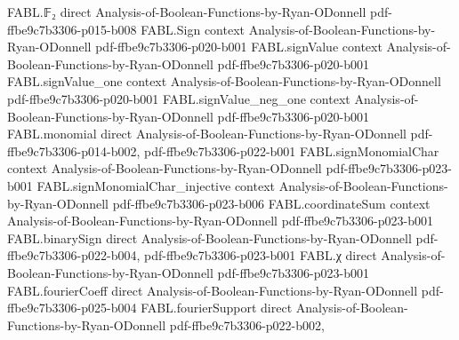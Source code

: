 \begin{theorem}
\label{FABL.widthThreeTseitin_width_le}
\leanok
{}
\proofstep
  {FABL.𝔽₂}
  {direct}
  {Analysis-of-Boolean-Functions-by-Ryan-ODonnell}
  {pdf-ffbe9c7b3306-p015-b008}
\proofstep
  {FABL.Sign}
  {context}
  {Analysis-of-Boolean-Functions-by-Ryan-ODonnell}
  {pdf-ffbe9c7b3306-p020-b001}
\proofstep
  {FABL.signValue}
  {context}
  {Analysis-of-Boolean-Functions-by-Ryan-ODonnell}
  {pdf-ffbe9c7b3306-p020-b001}
\proofstep
  {FABL.signValue_one}
  {context}
  {Analysis-of-Boolean-Functions-by-Ryan-ODonnell}
  {pdf-ffbe9c7b3306-p020-b001}
\proofstep
  {FABL.signValue_neg_one}
  {context}
  {Analysis-of-Boolean-Functions-by-Ryan-ODonnell}
  {pdf-ffbe9c7b3306-p020-b001}
\proofstep
  {FABL.monomial}
  {direct}
  {Analysis-of-Boolean-Functions-by-Ryan-ODonnell}
  {pdf-ffbe9c7b3306-p014-b002,
    pdf-ffbe9c7b3306-p022-b001}
\proofstep
  {FABL.signMonomialChar}
  {context}
  {Analysis-of-Boolean-Functions-by-Ryan-ODonnell}
  {pdf-ffbe9c7b3306-p023-b001}
\proofstep
  {FABL.signMonomialChar_injective}
  {context}
  {Analysis-of-Boolean-Functions-by-Ryan-ODonnell}
  {pdf-ffbe9c7b3306-p023-b006}
\proofstep
  {FABL.coordinateSum}
  {context}
  {Analysis-of-Boolean-Functions-by-Ryan-ODonnell}
  {pdf-ffbe9c7b3306-p023-b001}
\proofstep
  {FABL.binarySign}
  {direct}
  {Analysis-of-Boolean-Functions-by-Ryan-ODonnell}
  {pdf-ffbe9c7b3306-p022-b004,
    pdf-ffbe9c7b3306-p023-b001}
\proofstep
  {FABL.χ}
  {direct}
  {Analysis-of-Boolean-Functions-by-Ryan-ODonnell}
  {pdf-ffbe9c7b3306-p023-b001}
\proofstep
  {FABL.fourierCoeff}
  {direct}
  {Analysis-of-Boolean-Functions-by-Ryan-ODonnell}
  {pdf-ffbe9c7b3306-p025-b004}
\proofstep
  {FABL.fourierSupport}
  {direct}
  {Analysis-of-Boolean-Functions-by-Ryan-ODonnell}
  {pdf-ffbe9c7b3306-p022-b002,
}
\end{theorem}
